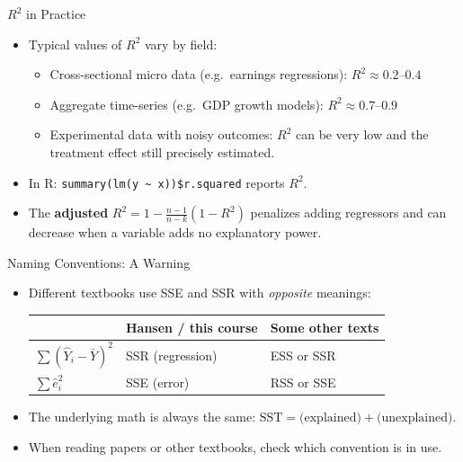 \documentclass[aspectratio=169, handout]{beamer}
\numberwithin{equation}{section}
\begin{document}
\begin{frame}{$R^2$ in Practice}
\begin{itemize}
\item Typical values of $R^2$ vary by field:
\begin{itemize}
\item Cross-sectional micro data (e.g.\ earnings regressions): $R^2\approx 0.2$--$0.4$
\item Aggregate time-series (e.g.\ GDP growth models): $R^2\approx 0.7$--$0.9$
\item Experimental data with noisy outcomes: $R^2$ can be very low and the treatment effect still precisely estimated.
\end{itemize}\pause
\item In R: \texttt{summary(lm(y \~{} x))\$r.squared} reports $R^2$.
\item The \textbf{adjusted} $R^2=1-\frac{n-1}{n-k}(1-R^2)$ penalizes adding regressors and can decrease when a variable adds no explanatory power.
\end{itemize}
\end{frame}

\begin{frame}{Naming Conventions: A Warning}
\begin{itemize}
\item Different textbooks use SSE and SSR with \emph{opposite} meanings:
\begin{center}
\begin{tabular}{lll}
& \textbf{Hansen / this course} & \textbf{Some other texts}\\
\hline
$\sum(\hat{Y}_i-\bar{Y})^2$ & SSR (regression) & ESS or SSR\\
$\sum \hat{e}_i^2$ & SSE (error) & RSS or SSE\\
\end{tabular}
\end{center}\pause
\item The underlying math is always the same: $\text{SST}=\text{(explained)} + \text{(unexplained)}$.
\item When reading papers or other textbooks, check which convention is in use.
\end{itemize}
\end{frame}
\end{document}
